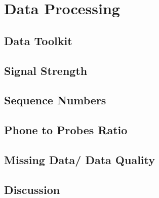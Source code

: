 \chapter{Data Processing}

\section{Data Toolkit}

\section{Signal Strength}

\section{Sequence Numbers}

\section{Phone to Probes Ratio}

\section{Missing Data/ Data Quality}

\section{Discussion}

